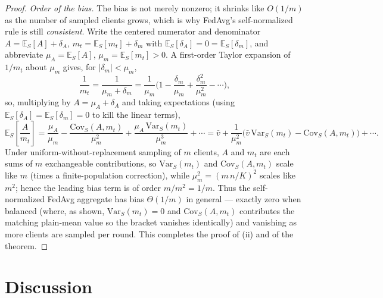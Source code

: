 \documentclass[11pt]{article}
\theoremstyle{definition}
\theoremstyle{remark}
\begin{document}
\begin{proof}
\smallskip
\noindent\emph{Order of the bias.} The bias is not merely nonzero; it shrinks like $O(1/m)$ as the number of sampled clients grows, which is why FedAvg's self-normalized rule is still \emph{consistent}. Write the centered numerator and denominator $A=\mathbb{E}_S[A]+\delta_A$, $m_t=\mathbb{E}_S[m_t]+\delta_m$ with $\mathbb{E}_S[\delta_A]=0=\mathbb{E}_S[\delta_m]$, and abbreviate $\mu_A=\mathbb{E}_S[A]$, $\mu_m=\mathbb{E}_S[m_t]>0$. A first-order Taylor expansion of $1/m_t$ about $\mu_m$ gives, for $|\delta_m|<\mu_m$,
\[
\frac{1}{m_t}=\frac{1}{\mu_m+\delta_m}=\frac{1}{\mu_m}\Big(1-\frac{\delta_m}{\mu_m}+\frac{\delta_m^2}{\mu_m^2}-\cdots\Big),
\]
so, multiplying by $A=\mu_A+\delta_A$ and taking expectations (using $\mathbb{E}_S[\delta_A]=\mathbb{E}_S[\delta_m]=0$ to kill the linear terms),
\[
\mathbb{E}_S\!\left[\frac{A}{m_t}\right]
=\frac{\mu_A}{\mu_m}
-\frac{\mathrm{Cov}_S(A,m_t)}{\mu_m^{2}}
+\frac{\mu_A\,\mathrm{Var}_S(m_t)}{\mu_m^{3}}
+\cdots
=\bar v
+\frac{1}{\mu_m^{2}}\Big(\bar v\,\mathrm{Var}_S(m_t)-\mathrm{Cov}_S(A,m_t)\Big)+\cdots .
\]
Under uniform-without-replacement sampling of $m$ clients, $A$ and $m_t$ are each sums of $m$ exchangeable contributions, so $\mathrm{Var}_S(m_t)$ and $\mathrm{Cov}_S(A,m_t)$ scale like $m$ (times a finite-population correction), while $\mu_m^{2}=(m\,n/K)^2$ scales like $m^2$; hence the leading bias term is of order $m/m^2=1/m$. Thus the self-normalized FedAvg aggregate has bias $\Theta(1/m)$ in general --- exactly zero when balanced (where, as shown, $\mathrm{Var}_S(m_t)=0$ and $\mathrm{Cov}_S(A,m_t)$ contributes the matching plain-mean value so the bracket vanishes identically) and vanishing as more clients are sampled per round. This completes the proof of (ii) and of the theorem.
\end{proof}

\section*{Discussion}
\end{document}
